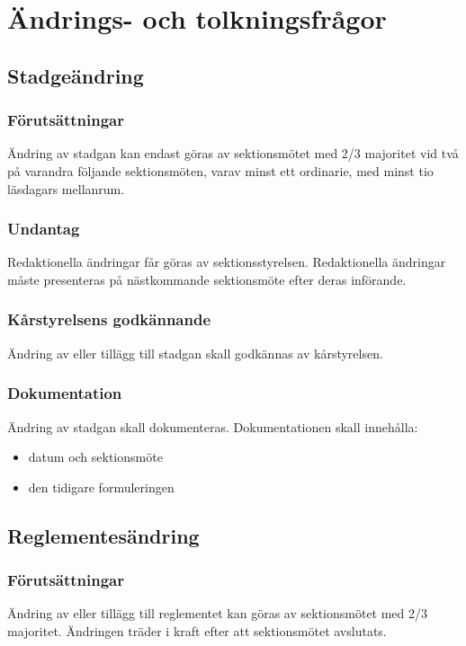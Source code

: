 \section{Ändrings- och tolkningsfrågor}

\subsection{Stadgeändring}

\subsubsection{Förutsättningar}
Ändring av stadgan kan endast göras av sektionsmötet med 2/3 majoritet vid två på varandra följande sektionsmöten, varav minst ett ordinarie, med minst tio läsdagars mellanrum.

\subsubsection{Undantag}
Redaktionella ändringar får göras av sektionsstyrelsen. Redaktionella ändringar måste presenteras på nästkommande sektionsmöte efter deras införande.

\subsubsection{Kårstyrelsens godkännande}
Ändring av eller tillägg till stadgan skall godkännas av kårstyrelsen.
\subsubsection{Dokumentation}
Ändring av stadgan skall dokumenteras. Dokumentationen skall innehålla:
\begin{itemize}
	\item datum och sektionsmöte
	\item den tidigare formuleringen
\end{itemize}

\subsection{Reglementesändring}
\subsubsection{Förutsättningar}
Ändring av eller tillägg till reglementet kan göras av sektionsmötet med 2/3 majoritet. Ändringen träder i kraft efter att sektionsmötet avslutats.

